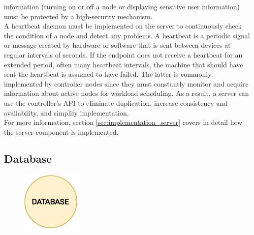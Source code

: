 information (turning on or off a node or displaying sensitive user information)
must be protected by a high-security mechanism. \\ %
A heartbeat daemon must be implemented on the server to continuously check the
condition of a node and detect any problems. A heartbeat is a periodic signal or
message created by hardware or software that is sent between devices at regular intervals
of seconds. If the endpoint does not receive a heartbeat for an extended period,
often many heartbeat intervals, the machine that should have sent the heartbeat
is assumed to have failed\cite{heartbeat}. The latter is commonly implemented by
controller nodes since they must constantly monitor and acquire information
about active nodes for workload scheduling. As a result, a server can use the
controller's API to eliminate duplication, increase consistency and availability,
and simplify implementation. \\ %
For more information, section \ref{sec:implementation_server} covers in detail how
the server component is implemented.

\subsection{Database}
\label{subsec:architecture_components_database}

\begin{figure}
  \centering
  \includegraphics[width=\linewidth]{images/architecture/database.pdf}
\end{figure}

